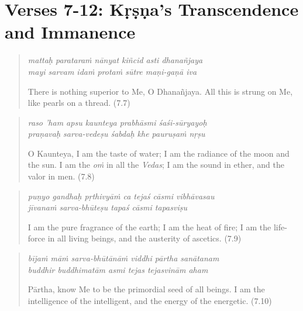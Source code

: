 \documentclass[12pt, twoside, openright]{memoir}
\begin{document}
\newpage
\section{Verses 7-12: Kṛṣṇa's Transcendence and Immanence}\label{sec-verses-7-12-krsna-s-transcendence-and-immanence}


\par
\begin{verse}
\textit{mattaḥ parataraṁ nānyat kiñcid asti dhanañjaya} \\
\textit{mayi sarvam idaṁ protaṁ sūtre maṇi-gaṇā iva}

\noindent There is nothing superior to Me, O Dhanañjaya. All this is strung on Me, like pearls on a thread. (7.7)
\end{verse}
\par



\par
\begin{verse}
\textit{raso ’ham apsu kaunteya prabhāsmi śaśi-sūryayoḥ} \\
\textit{praṇavaḥ sarva-vedeṣu śabdaḥ khe pauruṣaṁ nṛṣu}

\noindent O Kaunteya, I am the taste of water; I am the radiance of the moon and the sun. I am the \textit{oṁ} in all the \textit{Vedas}; I am the sound in ether, and the valor in men. (7.8)
\end{verse}
\par



\par
\begin{verse}
\textit{puṇyo gandhaḥ pṛthivyāṁ ca tejaś cāsmi vibhāvasau} \\
\textit{jīvanaṁ sarva-bhūteṣu tapaś cāsmi tapasviṣu}

\noindent I am the pure fragrance of the earth; I am the heat of fire; I am the life-force in all living beings, and the austerity of ascetics. (7.9)
\end{verse}
\par



\par
\begin{verse}
\textit{bījaṁ māṁ sarva-bhūtānāṁ viddhi pārtha sanātanam} \\
\textit{buddhir buddhimatām asmi tejas tejasvinām aham}

\noindent Pārtha, know Me to be the primordial seed of all beings. I am the intelligence of the intelligent, and the energy of the energetic. (7.10)
\end{verse}
\par
\end{document}
